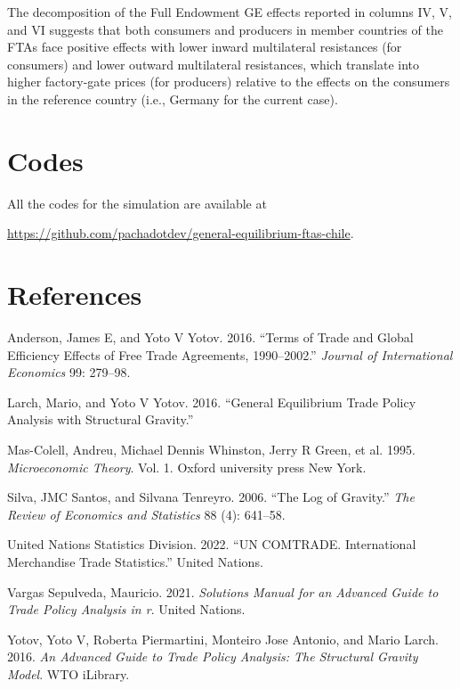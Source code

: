 \documentclass[10pt]{article}
\newenvironment{CSLReferences}[2]
  {}
  {\par}
\begin{document}
The decomposition of the Full Endowment GE effects reported in columns
IV, V, and VI suggests that both consumers and producers in member
countries of the FTAs face positive effects with lower inward
multilateral resistances (for consumers) and lower outward multilateral
resistances, which translate into higher factory-gate prices (for
producers) relative to the effects on the consumers in the reference
country (i.e., Germany for the current case).

\hypertarget{codes}{%
\section{Codes}\label{codes}}

All the codes for the simulation are available at

\url{https://github.com/pachadotdev/general-equilibrium-ftas-chile}.

\hypertarget{references}{%
\section*{References}\label{references}}

\hypertarget{refs}{}
\begin{CSLReferences}{1}{0}
\leavevmode{}%
Anderson, James E, and Yoto V Yotov. 2016. {``Terms of Trade and Global
Efficiency Effects of Free Trade Agreements, 1990--2002.''}
\emph{Journal of International Economics} 99: 279--98.

\leavevmode{}%
Larch, Mario, and Yoto V Yotov. 2016. {``General Equilibrium Trade
Policy Analysis with Structural Gravity.''}

\leavevmode{}%
Mas-Colell, Andreu, Michael Dennis Whinston, Jerry R Green, et al. 1995.
\emph{Microeconomic Theory}. Vol. 1. Oxford university press New York.

\leavevmode{}%
Silva, JMC Santos, and Silvana Tenreyro. 2006. {``The Log of Gravity.''}
\emph{The Review of Economics and Statistics} 88 (4): 641--58.

\leavevmode{}%
United Nations Statistics Division. 2022. {``UN COMTRADE. International
Merchandise Trade Statistics.''} United Nations.

\leavevmode{}%
Vargas Sepulveda, Mauricio. 2021. \emph{Solutions Manual for an Advanced
Guide to Trade Policy Analysis in r}. United Nations.

\leavevmode{}%
Yotov, Yoto V, Roberta Piermartini, Monteiro Jose Antonio, and Mario
Larch. 2016. \emph{An Advanced Guide to Trade Policy
Analysis\hspace{0pt}: The Structural Gravity Model}. WTO iLibrary.

\end{CSLReferences}

\end{document}
